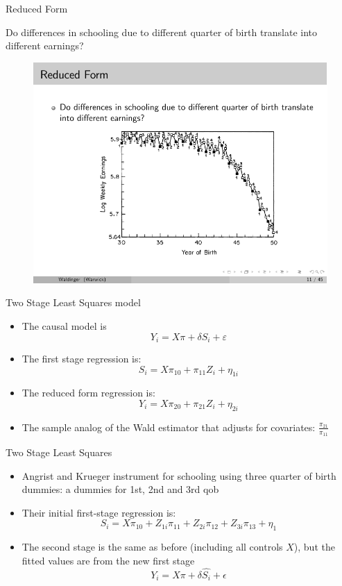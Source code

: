 \documentclass{beamer}
\begin{document}
\begin{frame}{Reduced Form}
	
	 Do differences in schooling due to different quarter of birth translate into different earnings?
	
	\begin{figure}
	\includegraphics{./lecture_includes/qob_3.pdf}
	\end{figure}
	
\end{frame}

\begin{frame}{Two Stage Least Squares model}
	
	\begin{itemize}
	\item The causal model is $$Y_i = X \pi + \delta S_i + \varepsilon$$
	\item The first stage regression is:$$S_i=X\pi_{10} + \pi_{11}Z_i + \eta_{1i}$$
	\item The reduced form regression is:$$Y_i=X\pi_{20} + \pi_{21}Z_i+\eta_{2i}$$
	\item The sample analog of the Wald estimator that adjusts for covariates: $\frac{\pi_{21}}{\pi_{11}}$
	\end{itemize}

\end{frame}

\begin{frame}{Two Stage Least Squares}
	
	\begin{itemize}
	\item Angrist and Krueger instrument for schooling using three quarter of birth dummies:  a dummies for 1st, 2nd and 3rd qob
	\item Their initial  first-stage regression is:$$S_i=X\pi_{10} + Z_{1i}\pi_{11} + Z_{2i}\pi_{12} + Z_{3i}\pi_{13}+\eta_1$$
	\item The second stage is the same as before (including all controls $X$), but the fitted values are from the new first stage $$Y_i = X \pi + \delta \widehat{S_i} + \epsilon$$
	\end{itemize}

\end{frame}
\end{document}

